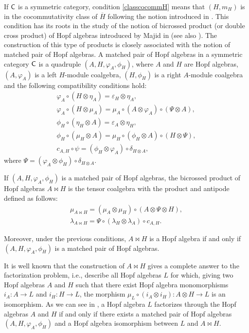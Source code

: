 \documentclass[10pt,a4paper]{amsart}
\numberwithin{equation}{section}
\begin{document}
\begin{Remark}
If ${\sf C}$ is a symmetric category, condition \eqref{classcocommH} means that $(H,m_{H})$ is in the cocommutativity class of $\overline{H}$ following the notion introduced in \cite[Definitions~2.1 and~2.2]{CCH}. This condition has its roots in the study of the notion of bicrossed product (or double cross product) of Hopf algebras introduced by Majid in \cite{M1990} (see also \cite{M1995}). The construction of this type of products is closely associated with the notion of matched pair of Hopf algebras. A matched pair of Hopf algebras in a symmetric category ${\sf C}$ is a quadruple $(A,H,\varphi_{A}, \phi_{H})$, where $A$ and $H$ are Hopf algebras, $(A,\varphi_{A})$ is a left $H$-module coalgebra, $(H, \phi_{H}) $ is a right $A$-module coalgebra and the following compatibility conditions hold:
\begin{gather*}
\varphi_{A}\circ (H\otimes \eta_{A})= \varepsilon_{H}\otimes \eta_{A}, \\
\varphi_{A}\circ (H\otimes \mu_{A})= \mu_{A}\circ (A\otimes \varphi_{A})\circ (\Psi \otimes A ), \\
\phi_{H}\circ (\eta_{H}\otimes A)= \varepsilon_{A}\otimes \eta_{H}, \\
\phi_{H}\circ (\mu_{H}\otimes A)=\mu_{H}\circ (\phi_{H}\otimes A)\circ (H\otimes \Psi), \\
c_{A,H}\circ \psi=(\phi_{H}\otimes \varphi_{A})\circ \delta_{H\otimes A},
\end{gather*}
where $\Psi=( \varphi_{A}\otimes \phi_{H})\circ \delta_{H\otimes A}$.

If $(A,H,\varphi_{A}, \phi_{H})$ is a matched pair of Hopf algebras, the bicrossed product of Hopf algebras $A\bowtie H$
 is the tensor coalgebra with the product and antipode defined as follows:
 \begin{gather*}
 \mu_{A\bowtie H}=(\mu_{A}\otimes \mu_{H})\circ (A\otimes \Psi\otimes H),\\
 \lambda_{A\bowtie H}=\Psi\circ (\lambda_{H}\otimes \lambda_{A})\circ c_{A,H}.
 \end{gather*}

 Moreover, under the previous conditions, $A\bowtie H$ is a Hopf algebra if and only if $(A,H,\varphi_{A}, \phi_{H})$ is a matched pair of Hopf algebras.

It is well known that the construction of $A\bowtie H$ gives a complete answer to the factorization problem, i.e., describe all Hopf algebras $L$ for which, giving two Hopf algebras $A$ and $H$ such that there exist Hopf algebra monomorphisms $i_{A}\colon A\rightarrow L$ and $i_{H}\colon H\rightarrow L$, the morphism $\mu_{L}\circ (i_{A}\otimes i_{H})\colon A\otimes H\rightarrow L$ is an isomorphism. As we can see in \cite[Theorem 7.2.3]{M1995}, a Hopf algebra $L$ factorizes through the Hopf algebras $A$ and $H$ if and only if there exists a matched pair of Hopf algebras $(A,H,\varphi_{A}, \phi_{H})$ and a Hopf algebra isomorphism between $L$ and $A\bowtie H$.


\end{Remark}
\end{document}
